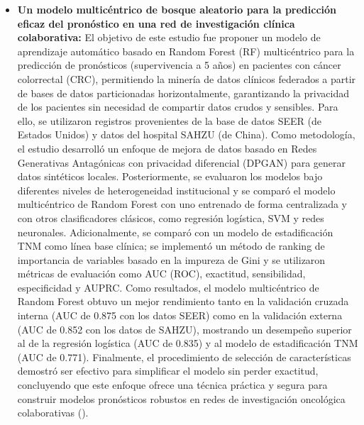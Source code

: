 \begin{itemize}
\item \textbf{Un modelo multicéntrico de bosque aleatorio para la predicción eficaz del pronóstico en una red de investigación clínica colaborativa:} El objetivo de este estudio fue proponer un modelo de aprendizaje automático basado en Random Forest (RF) multicéntrico para la predicción de pronósticos (supervivencia a 5 años) en pacientes con cáncer colorrectal (CRC), permitiendo la minería de datos clínicos federados a partir de bases de datos particionadas horizontalmente, garantizando la privacidad de los pacientes sin necesidad de compartir datos crudos y sensibles. Para ello, se utilizaron registros provenientes de la base de datos SEER (de Estados Unidos) y datos del hospital SAHZU (de China). Como metodología, el estudio desarrolló un enfoque de mejora de datos basado en Redes Generativas Antagónicas con privacidad diferencial (DPGAN) para generar datos sintéticos locales. Posteriormente, se evaluaron los modelos bajo diferentes niveles de heterogeneidad institucional y se comparó el modelo multicéntrico de Random Forest con uno entrenado de forma centralizada y con otros clasificadores clásicos, como regresión logística, SVM y redes neuronales. Adicionalmente, se comparó con un modelo de estadificación TNM como línea base clínica; se implementó un método de ranking de importancia de variables basado en la impureza de Gini y se utilizaron métricas de evaluación como AUC (ROC), exactitud, sensibilidad, especificidad y AUPRC. Como resultados, el modelo multicéntrico de Random Forest obtuvo un mejor rendimiento tanto en la validación cruzada interna (AUC de 0.875 con los datos SEER) como en la validación externa (AUC de 0.852 con los datos de SAHZU), mostrando un desempeño superior al de la regresión logística (AUC de 0.835) y al modelo de estadificación TNM (AUC de 0.771). Finalmente, el procedimiento de selección de características demostró ser efectivo para simplificar el modelo sin perder exactitud, concluyendo que este enfoque ofrece una técnica práctica y segura para construir modelos pronósticos robustos en redes de investigación oncológica colaborativas (\cite{article11}).

\end{itemize}
